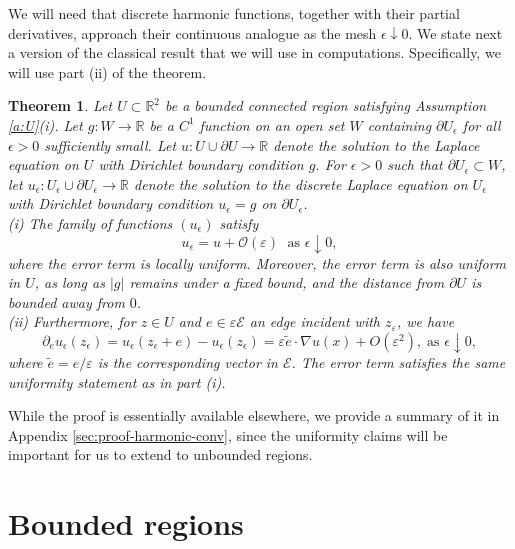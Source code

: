 \documentclass[11pt]{article}
\newtheorem{theorem}{Theorem}[section]
\theoremstyle{remark}
\def\eps{\varepsilon}
\def\cE{\mathcal{E}}
\begin{document}
We will need that discrete harmonic functions, together with their partial derivatives, approach their continuous analogue as the mesh \(\epsilon\downarrow 0\). We state next a version of the classical result \cite{Courtant1928} that we will use in computations. Specifically, we will 
use part (ii) of the theorem.

\begin{theorem}
\label{thm2_3}
    Let $U\subset\mathbb{R}^2$ be a bounded connected region satisfying Assumption \ref{a:U}(i). Let \(g : W\rightarrow \mathbb{R}\) be a $C^1$ function on an open set \(W\) containing \(\partial U_\epsilon\) for all \(\epsilon > 0\) sufficiently small. Let \(u : U \cup \partial U \rightarrow \mathbb{R}\) denote the solution to the Laplace equation on \(U\) with Dirichlet boundary condition \(g\). For \(\epsilon > 0\) such that \(\partial U_\epsilon \subset W\), let \(u_\epsilon : U_\epsilon \cup \partial U_\epsilon \rightarrow \mathbb{R}\) denote the solution to the discrete Laplace equation on \(U_\epsilon\) with Dirichlet boundary condition \(u_\epsilon = g\) on \(\partial U_\epsilon\). \\
    (i) The family of functions \((u_\epsilon)\) satisfy
    \[
        u_\epsilon = u + \mathcal{O}(\eps) \; \text{ as } \epsilon \downarrow 0,
    \]
    where the error term is locally uniform. Moreover, the error term is also uniform 
    in $U$, as long as $|g|$ remains under a fixed bound, and the distance from 
    $\partial U$ is bounded away from $0$.\\
    (ii) Furthermore, for \(z \in U\) and \(e \in \eps \cE\) an edge incident 
    with $z_\eps$, we have 
    \[
        \partial_e u_\epsilon(z_\epsilon) 
        = u_\epsilon(z_\epsilon + e)-u_\epsilon(z_\epsilon)
        = \eps \tilde{e} \cdot \nabla u (x) + O(\eps^2), \; \text{as } \epsilon \downarrow 0,
    \]
    where $\tilde{e} = e/\eps$ is the corresponding vector in $\cE$. 
    The error term satisfies the same uniformity statement as in part (i).
\end{theorem}

While the proof is essentially available elsewhere, we provide a summary of it in 
Appendix \ref{sec:proof-harmonic-conv}, since the uniformity claims will
be important for us to extend to unbounded regions. 


\section{Bounded regions}
\label{sec:proof-main}
\end{document}
